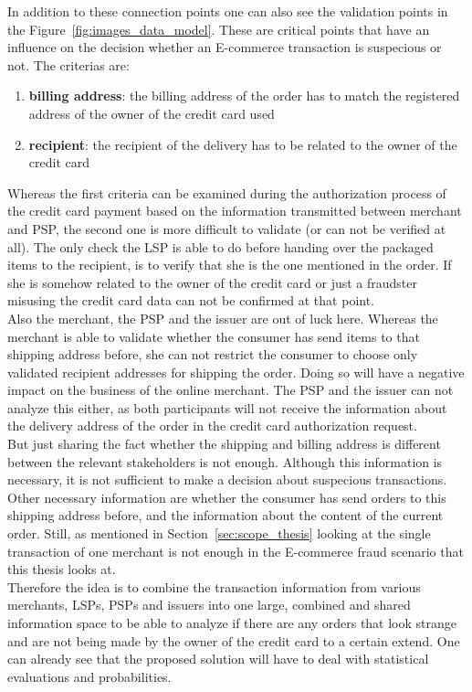 In addition to these connection points one can also see the validation points in the Figure~\ref{fig:images_data_model}. These are critical points that have an influence on the decision whether an E-commerce transaction is suspecious or not. The criterias are: \@

\begin{enumerate}
  \item \textbf{billing address}: the billing address of the order has to match the registered address of the owner of the credit card used
  \item \textbf{recipient}: the recipient of the delivery has to be related to the owner of the credit card
\end{enumerate}

Whereas the first criteria can be examined during the authorization process of the credit card payment based on the information transmitted between merchant and \gls{PSP}, the second one is more difficult to validate (or can not be verified at all). The only check the \gls{LSP} is able to do before handing over the packaged items to the recipient, is to verify that she is the one mentioned in the order. If she is somehow related to the owner of the credit card or just a fraudster misusing the credit card data can not be confirmed at that point. \\

Also the merchant, the \gls{PSP} and the issuer are out of luck here. Whereas the merchant is able to validate whether the consumer has send items to that shipping address before, she can not restrict the consumer to choose only validated recipient addresses for shipping the order. Doing so will have a negative impact on the business of the online merchant. The \gls{PSP} and the issuer can not analyze this either, as both participants will not receive the information about the delivery address of the order in the credit card authorization request. \\

But just sharing the fact whether the shipping and billing address is different between the relevant stakeholders is not enough. Although this information is necessary, it is not sufficient to make a decision about suspecious transactions. Other necessary information are whether the consumer has send orders to this shipping address before, and the information about the content of the current order. Still, as mentioned in Section~\ref{sec:scope_thesis} looking at the single transaction of one merchant is not enough in the E-commerce fraud scenario that this thesis looks at. \\

Therefore the idea is to combine the transaction information from various merchants, \gls{LSP}s, \gls{PSP}s and issuers into one large, combined and shared information space to be able to analyze if there are any orders that look strange and are not being made by the owner of the credit card to a certain extend. One can already see that the proposed solution will have to deal with statistical evaluations and probabilities. \\



